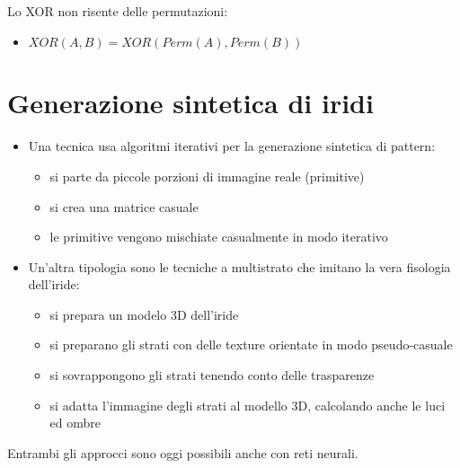 \documentclass{report}
\begin{document}
\noindent Lo XOR non risente delle permutazioni:
\begin{itemize}
    \item $XOR(A,B) = XOR( Perm(A), Perm(B))$
\end{itemize}

\section{Generazione sintetica di iridi}
\begin{itemize}
    \item Una tecnica usa algoritmi iterativi per la generazione sintetica di pattern:
    \begin{itemize}
        \item si parte da piccole porzioni di immagine reale (primitive)
        \item si crea una matrice casuale 
        \item le primitive vengono mischiate casualmente in modo iterativo
    \end{itemize}
    \item Un'altra tipologia sono le tecniche a multistrato che imitano la vera fisologia dell'iride:
    \begin{itemize}
        \item si prepara un modelo 3D dell'iride 
        \item si preparano gli strati con delle texture orientate in modo pseudo-casuale 
        \item si sovrappongono gli strati tenendo conto delle trasparenze 
        \item si adatta l'immagine degli strati al modello 3D, calcolando anche le luci ed ombre
    \end{itemize}
\end{itemize}

\noindent Entrambi gli approcci sono oggi possibili anche con reti neurali.
\end{document}
